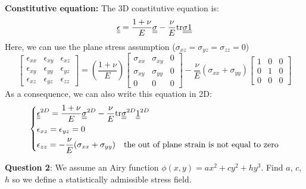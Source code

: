 \textbf{Constitutive equation:}
The 3D constitutive equation is:
\begin{equation}
\underline{\underline{\epsilon}} = \frac{1+\nu}{E} \underline{\underline{\sigma}} - \frac{\nu}{E}\text{tr}\underline{\underline{\sigma}} \underline{\underline{1}}
\end{equation}
Here, we can use the plane stress assumption ($\sigma_{xz} = \sigma_{yz} = \sigma_{zz} = 0$)
\begin{equation}
\left[ \begin{matrix}
\epsilon_{xx} & \epsilon_{xy} & \epsilon_{xz} \\
\epsilon_{xy} & \epsilon_{yy} & \epsilon_{yz} \\
\epsilon_{xz} & \epsilon_{yz} & \epsilon_{zz}
\end{matrix}\right] =\left( \frac{1+\nu}{E}\right) \left[ \begin{matrix}
\sigma_{xx} & \sigma_{xy} & 0 \\
\sigma_{xy} & \sigma_{yy} & 0 \\
0 & 0 & 0
\end{matrix}\right] - \frac{\nu}{E}\left( \sigma_{xx}+\sigma_{yy} \right) \left[ \begin{matrix}
1 & 0 & 0 \\
0 & 1 & 0 \\
0 & 0 & 0
\end{matrix}\right]
\end{equation}
As a consequence, we can also write this equation in 2D:
\begin{equation}
\left\lbrace \begin{split}
& \underline{\underline{\epsilon}}^{2D} = \frac{1+\nu}{E} \underline{\underline{\sigma}}^{2D} - \frac{\nu}{E} \text{tr} \underline{\underline{\sigma}}^{2D} \underline{\underline{1}}^{2D} \\
&  \epsilon_{xz} = \epsilon_{yz} = 0 \\
&  \epsilon_{zz} = -\frac{\nu}{E} (\sigma_{xx}+\sigma_{yy}) \quad \text{the out of plane strain is not equal to zero}\\
\end{split} \right. 
\end{equation}

\noindent \textbf{Question 2}: We assume an Airy function $\phi(x,y) = ax^2 + cy^2 + h y^3$. Find $a$, $c$, $h$ so we define a statistically admissible stress field. \\

